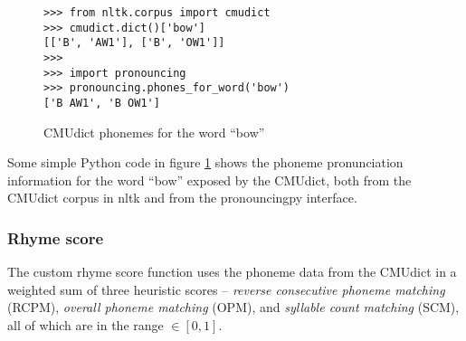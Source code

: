 \documentclass[11pt,a4paper]{article}
\begin{document}
\begin{figure}
\begin{Verbatim}[fontsize=\small]
>>> from nltk.corpus import cmudict
>>> cmudict.dict()['bow']
[['B', 'AW1'], ['B', 'OW1']]
>>>
>>> import pronouncing
>>> pronouncing.phones_for_word('bow')
['B AW1', 'B OW1']
\end{Verbatim}
\caption{CMUdict phonemes for the word ``bow''}
\label{fig:cmudict}
\end{figure}

Some simple Python code in figure \ref{fig:cmudict} shows the phoneme pronunciation information for the word ``bow'' exposed by the CMUdict, both from the CMUdict corpus in nltk and from the pronouncingpy interface.

\subsubsection{Rhyme score}
\label{sec:rhymescore}
The custom rhyme score function uses the phoneme data from the CMUdict in a weighted sum of three heuristic scores -- \textit{reverse consecutive phoneme matching} (RCPM), \textit{overall phoneme matching} (OPM), and \textit{syllable count matching} (SCM), all of which are in the range $\in [0, 1]$.
\end{document}
